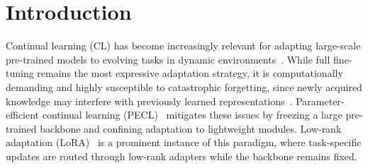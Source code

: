 \documentclass{article}
\theoremstyle{plain}
\theoremstyle{definition}
\theoremstyle{remark}
\begin{document}

\section{Introduction}

Continual learning (CL) has become increasingly relevant for adapting large-scale pre-trained models to evolving tasks in dynamic environments~\cite{PARISI201954,10444954,a2923225ea7d94e6c86faff97e23c69be,10.1145/3735633}. While full fine-tuning remains the most expressive adaptation strategy, it is computationally demanding and highly susceptible to catastrophic forgetting, since newly acquired knowledge may interfere with previously learned representations~\cite{howard2018universallanguagemodelfinetuning,doi:10.1073/pnas.1611835114,pmlr-v234-zhai24a,luo2025empiricalstudycatastrophicforgetting}. Parameter-efficient continual learning (PECL)~\cite{pmlr-v97-houlsby19a,dingParameterefficientFinetuningLargescale2023,He_2025_CVPR,NEURIPS2024_b0bc711f} mitigates these issues by freezing a large pre-trained backbone and confining adaptation to lightweight modules. Low-rank adaptation (LoRA)~\cite{hu2022lora} is a prominent instance of this paradigm, where task-specific updates are routed through low-rank adapters while the backbone remains fixed.
\end{document}
